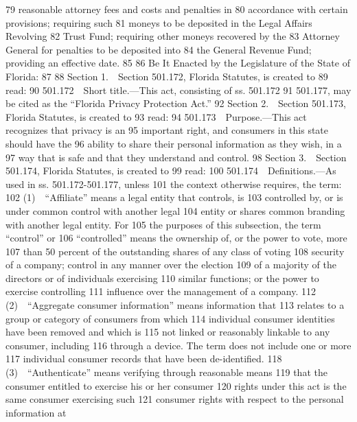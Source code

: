    79         reasonable attorney fees and costs and penalties in
   80         accordance with certain provisions; requiring such
   81         moneys to be deposited in the Legal Affairs Revolving
   82         Trust Fund; requiring other moneys recovered by the
   83         Attorney General for penalties to be deposited into
   84         the General Revenue Fund; providing an effective date.
   85          
   86  Be It Enacted by the Legislature of the State of Florida:
   87  
   88         Section 1. Section 501.172, Florida Statutes, is created to
   89  read:
   90         501.172 Short title.—This act, consisting of ss. 501.172
   91  501.177, may be cited as the “Florida Privacy Protection Act.”
   92         Section 2. Section 501.173, Florida Statutes, is created to
   93  read:
   94         501.173 Purpose.—This act recognizes that privacy is an
   95  important right, and consumers in this state should have the
   96  ability to share their personal information as they wish, in a
   97  way that is safe and that they understand and control.
   98         Section 3. Section 501.174, Florida Statutes, is created to
   99  read:
  100         501.174 Definitions.—As used in ss. 501.172-501.177, unless
  101  the context otherwise requires, the term:
  102         (1) “Affiliate” means a legal entity that controls, is
  103  controlled by, or is under common control with another legal
  104  entity or shares common branding with another legal entity. For
  105  the purposes of this subsection, the term “control” or
  106  “controlled” means the ownership of, or the power to vote, more
  107  than 50 percent of the outstanding shares of any class of voting
  108  security of a company; control in any manner over the election
  109  of a majority of the directors or of individuals exercising
  110  similar functions; or the power to exercise controlling
  111  influence over the management of a company.
  112         (2) “Aggregate consumer information” means information that
  113  relates to a group or category of consumers from which
  114  individual consumer identities have been removed and which is
  115  not linked or reasonably linkable to any consumer, including
  116  through a device. The term does not include one or more
  117  individual consumer records that have been de-identified.
  118         (3) “Authenticate” means verifying through reasonable means
  119  that the consumer entitled to exercise his or her consumer
  120  rights under this act is the same consumer exercising such
  121  consumer rights with respect to the personal information at
